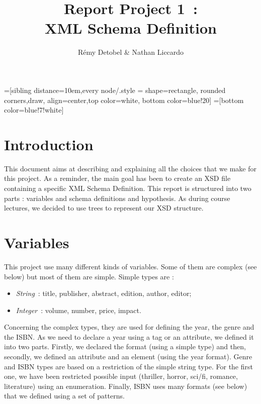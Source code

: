 \documentclass{article}
\author{R\'emy Detobel \& Nathan Liccardo}
\title{Report Project 1~:\\XML Schema Definition}
\begin{document}
=[sibling distance=10em,every node/.style = {shape=rectangle, rounded corners,draw, align=center,top color=white, bottom color=blue!20}]
=[bottom color=blue!7!white]

\maketitle

\section{Introduction}
This document aims at describing and explaining all the choices that we make for this project. As a reminder, the main goal has been to create an XSD file containing a specific XML Schema Definition. This report is structured into two parts : variables and schema definitions and hypothesis. As during course lectures, we decided to use trees to represent our XSD structure.
  
  
  
\section{Variables}
  \label{sec:variables}
This project use many different kinds of variables. Some of them are complex (see below) but most of them are simple. Simple types are : 
  \begin{itemize}
    \item \textit{String}~: title, publisher, abstract, edition, author, editor;
    \item \textit{Integer}~: volume, number, price, impact.
  \end{itemize}
Concerning the complex types, they are used for defining the year, the genre and the ISBN. As we need to declare a year using a tag or an attribute, we defined it into two parts. Firstly, we declared the format (using a simple type) and then, secondly, we defined an attribute and an element (using the year format). Genre and ISBN types are based on a restriction of the simple string type. For the first one, we have been restricted possible input (thriller, horror, sci/fi, romance, literature) using an enumeration. Finally, ISBN uses many formats (see below) that we defined using a set of patterns.
  
\end{document}
